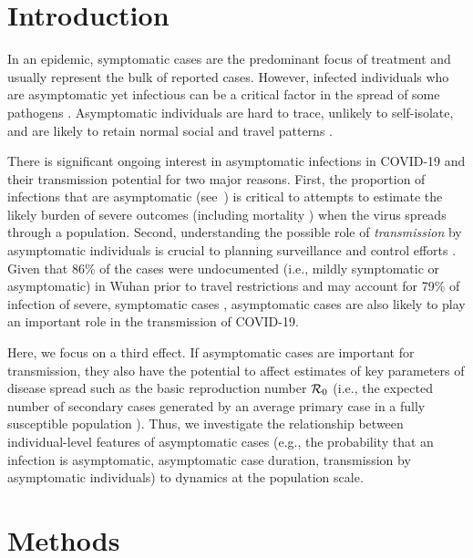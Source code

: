 \section{Introduction}

In an epidemic, symptomatic cases are the predominant focus of treatment and usually represent the bulk of reported cases. 
However, infected individuals who are asymptomatic yet infectious can be a critical factor in the spread of some pathogens \citep{fraser2004factors}.
Asymptomatic individuals are hard to trace, unlikely to self-isolate, and are likely to retain normal social and travel patterns \citep{quilty2020effectiveness}.

There is significant ongoing interest in asymptomatic infections in COVID-19 \citep{chan2020familial, pan2020asymptomatic, tangearly} and their transmission potential \citep{bai2020presumed} for two major reasons.
First, the proportion of infections that are asymptomatic (see~\citep{mizumoto_2020}) is critical to attempts to estimate the likely burden of severe outcomes (including mortality \citep{fauci_nejm2020}) when the virus spreads through a population.
Second, understanding the possible role of \emph{transmission} by asymptomatic individuals is crucial to planning surveillance and control efforts \citep{fraser2004factors}.
Given that 86\% of the cases were undocumented (i.e., mildly symptomatic or asymptomatic) in Wuhan prior to travel restrictions and may account for 79\% of infection of severe, symptomatic cases \citep{Lieabb3221}, asymptomatic cases are also likely to play an important role in the transmission of COVID-19.

Here, we focus on a third effect. 
If asymptomatic cases are important for transmission, they also have the potential to affect estimates of key parameters of disease spread such as the basic reproduction number ${\cal{R}}_0$ (i.e., the expected number of secondary cases generated by an average primary case in a fully susceptible population \citep{anderson1992infectious}). 
Thus, we investigate the relationship between individual-level features of asymptomatic cases (e.g., the probability that an infection is asymptomatic, asymptomatic case duration, transmission by asymptomatic individuals) to dynamics at the population scale.

\section{Methods}

